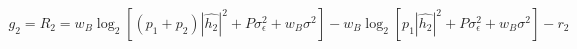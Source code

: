 \documentclass[preview]{standalone}
\begin{document}
\begin{align*}
g_2 = R_2 = w_B \log_2 \left[(p_1 + p_2) \left|\hat{h_2}\right|^2 + P \sigma_{\epsilon}^2 + w_B \sigma^2\right] - w_B \log_2 \left[p_1 \left|\hat{h_2}\right|^2 + P \sigma_{\epsilon}^2 + w_B \sigma^2\right] - r_2
\end{align*}
\end{document}
